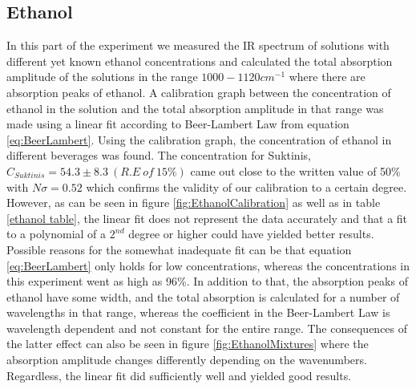 \documentclass[reprint,amsmath,amssymb,aps, prl,superscriptaddress]{revtex4-2}
\begin{document}
\subsection{Ethanol}
In this part of the experiment we measured the IR spectrum of solutions with different yet 
known ethanol concentrations
and calculated the total absorption amplitude of the solutions in the range $1000-1120 cm^{-1}$ where there are absorption peaks of ethanol. A calibration graph between the concentration of ethanol in the solution and the total absorption amplitude in that range was made using a linear fit according to Beer-Lambert Law from equation \ref{eq:BeerLambert}. 
Using the calibration graph, the concentration of ethanol in different beverages was found. The concentration for Suktinis, $C_{Suktinis}=54.3\pm8.3\ (R.E\ of\ 15\%)$ came out close to the written value of 50\% with $N{\sigma}=0.52$ \cite{Suktinis} which confirms the validity of our calibration to a certain degree. However, as can be seen in figure \ref{fig:EthanolCalibration}
as well as in table \ref{ethanol table},
the linear fit does not represent the data accurately and that a fit to a polynomial of a $2^{nd}$ degree or higher could have yielded better results. Possible reasons for the somewhat inadequate fit can be that equation \ref{eq:BeerLambert} only holds for low concentrations, whereas 
the concentrations
in this experiment went as high as 96\%. In addition to that, the absorption peaks of ethanol
have some width, and the total
absorption is calculated
for a number of wavelengths in that range, whereas the coefficient in the
Beer-Lambert Law is wavelength dependent and not constant for the entire range.
The consequences of the latter effect can also be seen in figure \ref{fig:EthanolMixtures} where the absorption amplitude changes differently depending on the wavenumbers.
Regardless, the linear fit did sufficiently well and yielded good results.
\end{document}
